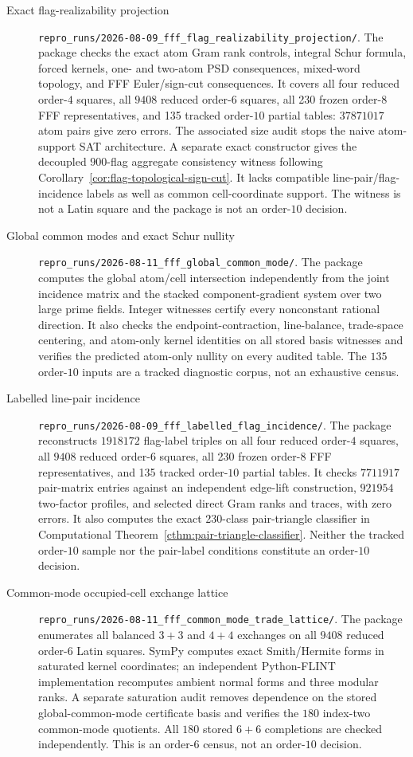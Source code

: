 \begin{description}
\item[Exact flag-realizability projection]
\nolinkurl{repro_runs/2026-08-09_fff_flag_realizability_projection/}.
The package checks the exact atom Gram rank controls, integral Schur formula,
forced kernels, one- and two-atom PSD consequences, mixed-word topology, and
FFF Euler/sign-cut consequences.  It covers all four reduced order-$4$
squares, all $9408$ reduced order-$6$ squares, all 230 frozen order-$8$ FFF
representatives, and 135 tracked order-$10$ partial tables: $37871017$ atom
pairs give zero errors.  The associated size audit stops the naive
atom-support SAT architecture.  A separate exact constructor gives the
decoupled $900$-flag aggregate consistency witness following
Corollary~\ref{cor:flag-topological-sign-cut}.
It lacks compatible line-pair/flag-incidence labels as well as common
cell-coordinate support.  The witness is not a Latin square and the package
is not an order-$10$ decision.

\item[Global common modes and exact Schur nullity]
\nolinkurl{repro_runs/2026-08-11_fff_global_common_mode/}.
The package computes the global atom/cell intersection independently from
the joint incidence matrix and the stacked component-gradient system over
two large prime fields.  Integer witnesses certify every nonconstant
rational direction.  It also checks the endpoint-contraction, line-balance,
trade-space centering, and atom-only kernel identities on all stored basis
witnesses and verifies the predicted atom-only nullity on every audited
table.  The $135$ order-$10$ inputs are a tracked diagnostic corpus, not an
exhaustive census.

\item[Labelled line-pair incidence]
\nolinkurl{repro_runs/2026-08-09_fff_labelled_flag_incidence/}.
The package reconstructs $1918172$ flag-label triples on all four reduced
order-$4$ squares, all $9408$ reduced order-$6$ squares, all 230 frozen
order-$8$ FFF representatives, and 135 tracked order-$10$ partial tables.
It checks $7711917$ pair-matrix entries against an independent edge-lift
construction, $921954$ two-factor profiles, and selected direct Gram ranks
and traces, with zero errors.  It also computes the exact 230-class
pair-triangle classifier in Computational
Theorem~\ref{cthm:pair-triangle-classifier}.  Neither the tracked order-$10$
sample nor the pair-label conditions constitute an order-$10$ decision.

\item[Common-mode occupied-cell exchange lattice]
\nolinkurl{repro_runs/2026-08-11_fff_common_mode_trade_lattice/}.
The package enumerates all balanced $3+3$ and $4+4$ exchanges on all $9408$
reduced order-$6$ Latin squares.  SymPy computes exact Smith/Hermite forms in
saturated kernel coordinates; an independent Python-FLINT implementation
recomputes ambient normal forms and three modular ranks.  A separate
saturation audit removes dependence on the stored global-common-mode
certificate basis and
verifies the $180$ index-two common-mode quotients.  All $180$ stored
$6+6$ completions are checked independently.  This is an order-$6$ census,
not an order-$10$ decision.


\end{description}
